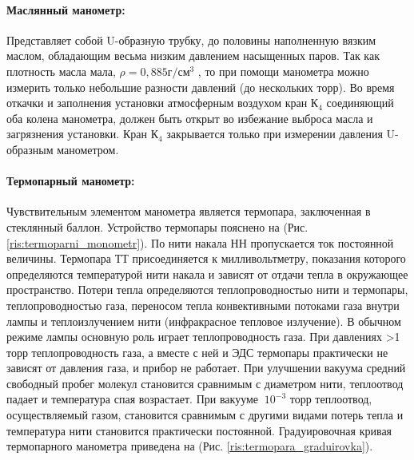 \documentclass[a4paper, 12pt]{article}
\begin{document}
    \paragraph{Маслянный манометр:}
    Представляет собой U-образную трубку, до половины наполненную вязким маслом, обладающим весьма низким давлением насыщенных паров. Так как плотность масла мала, $\rho = 0,885 г/см^3$ , то при помощи манометра можно измерить только небольшие разности давлений (до нескольких торр). Во время откачки и заполнения установки атмосферным воздухом кран $К_4$ соединяющий оба колена манометра, должен быть открыт во избежание выброса масла и загрязнения установки. Кран $К_4$ закрывается только при измерении давления U-образным манометром.

    \paragraph{Термопарный манометр:}
    Чувствительным элементом манометра является термопара, заключенная в стеклянный баллон. Устройство термопары пояснено на (Рис. \ref{ris:termoparni_monometr}). По нити накала НН пропускается ток постоянной величины. Термопара ТТ присоединяется к милливольтметру, показания которого определяются температурой нити накала и зависят от отдачи тепла в окружающее пространство. Потери тепла определяются теплопроводностью нити и термопары, теплопроводностью газа, переносом тепла конвективными потоками газа внутри лампы и теплоизлучением нити (инфракрасное тепловое излучение). В обычном режиме лампы основную роль играет теплопроводность газа. При давлениях >1 торр теплопроводность газа, а вместе с ней и ЭДС термопары практически не зависят от давления газа, и прибор не работает. При улучшении вакуума средний свободный пробег молекул становится сравнимым с диаметром нити, теплоотвод падает и температура спая возрастает. При вакууме $~10^{-3}$ торр теплоотвод, осуществляемый газом, становится сравнимым с другими видами потерь тепла и температура нити становится практически постоянной. Градуировочная кривая термопарного манометра приведена на (Рис. \ref{ris:termopara_graduirovka}).
\end{document}
